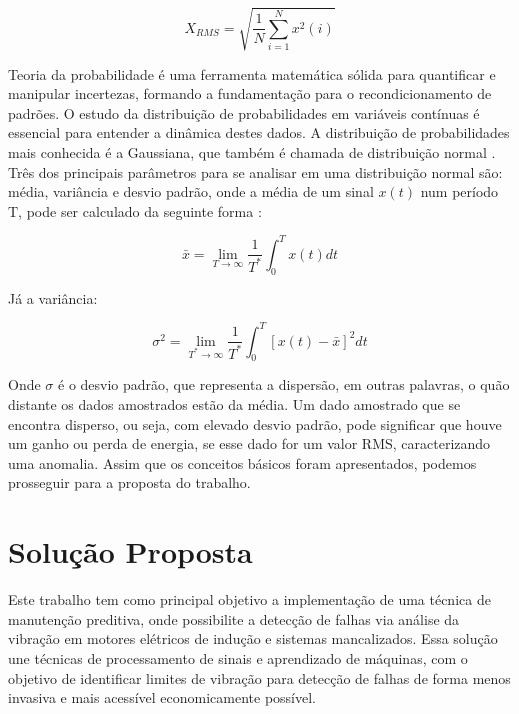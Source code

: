 \documentclass[a4paper]{ifacconf}
\begin{document}
\begin{equation}\label{eq:rms_disc}
    X_{RMS} = \sqrt{\frac{1}{N}\sum_{i=1}^{N}{x^2(i)}}
\end{equation}

Teoria da probabilidade é uma ferramenta matemática sólida
para quantificar e manipular incertezas, formando a fundamentação para o recondicionamento de padrões. O estudo da 
distribuição de probabilidades em variáveis contínuas é essencial para entender a dinâmica destes dados. A distribuição de probabilidades mais
conhecida é a Gaussiana, que também é chamada de distribuição normal \cite{Andersen1986}. Três dos principais parâmetros para se analisar
em uma distribuição normal são: média, variância e desvio padrão, onde a média de um sinal $x(t)$ num período T, pode ser calculado da seguinte
forma \cite{Dinardo}:

\begin{equation}\label{eq:X_lim}
    \bar{x} = \lim_{T\rightarrow\infty}{\frac{1}{T^*}} \int_{0}^{T}{x(t)dt}
\end{equation}

Já a variância:

\begin{equation}\label{eq:variancia}
    \sigma^2 = \lim_{T^{*}\rightarrow\infty}{\frac{1}{T^*}} \int_{0}^{T}{[x(t)-\bar{x}]^2dt}
\end{equation}

Onde $\sigma$ é o desvio padrão, que representa a dispersão, em outras palavras, o quão distante os dados amostrados estão da média. Um dado
amostrado que se encontra disperso, ou seja, com elevado desvio padrão, pode significar que houve um ganho ou perda de energia, se esse dado
for um valor RMS, caracterizando uma anomalia. Assim que os conceitos básicos foram apresentados, podemos prosseguir para a proposta do trabalho.



\section{Solução Proposta}

Este trabalho tem como principal objetivo a implementação de uma técnica de manutenção preditiva, onde possibilite a detecção
de falhas via análise da vibração em motores elétricos de indução e sistemas mancalizados. Essa solução une técnicas de processamento de 
sinais e aprendizado de máquinas, com o objetivo de identificar limites de vibração para detecção de falhas de forma menos invasiva e mais 
acessível economicamente possível. 
\end{document}

